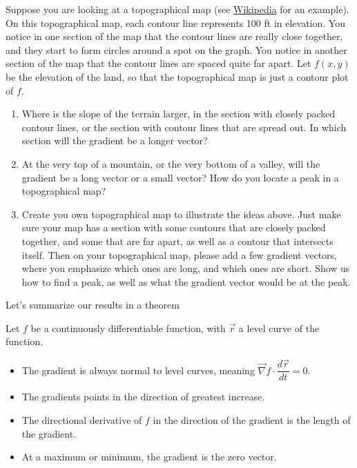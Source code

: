 \begin{problem}
 Suppose you are looking at a topographical map (see \href{http://en.wikipedia.org/wiki/Topographic_map}{Wikipedia} for an example).  On this topographical map, each contour line represents 100 ft in elevation. You notice in one section of the map that the contour lines are really close together, and they start to form circles around a spot on the graph. You notice in another section of the map that the contour lines are spaced quite far apart. Let $f(x,y)$ be the elevation of the land, so that the topographical map is just a contour plot of $f$.  
\begin{enumerate}
 \item{}%
 Where is the slope of the terrain larger, in the section with closely packed contour lines, or the section with contour lines that are spread out. In which section will the gradient be a longer vector?
 \item At the very top of a mountain, or the very bottom of a valley, will the gradient be a long vector or a small vector? How do you locate a peak in a topographical map?
 \item {}%
Create you own topographical map to illustrate the ideas above. Just make sure your map has a section with some contours that are closely packed together, and some that are far apart, as well as a contour that intersects itself. Then on your topographical map, please add a few gradient vectors, where you emphasize which ones are long, and which ones are short. Show us how to find a peak, as well as what the gradient vector would be at the peak.  
\end{enumerate}
\end{problem}

Let's summarize our results in a theorem
\begin{theorem}
 Let $f$ be a continuously differentiable function, with $\vec r$ a level curve of the function.
\begin{itemize}
 \item The gradient is always normal to level curves, meaning $\vec \nabla f\cdot \dfrac{d\vec r}{dt}=0$.
 \item The gradients points in the direction of greatest increase.
 \item The directional derivative of $f$ in the direction of the gradient is the length of the gradient.
 \item At a maximum or minimum, the gradient is the zero vector. 
\end{itemize}
\end{theorem}

